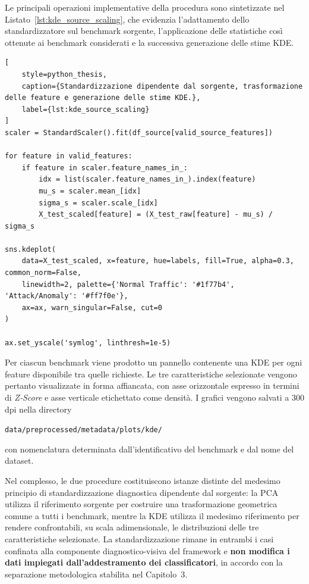 Le principali operazioni implementative della procedura sono sintetizzate
nel Listato~\ref{lst:kde_source_scaling}, che evidenzia l'adattamento dello
standardizzatore sul benchmark sorgente, l'applicazione delle statistiche
così ottenute ai benchmark considerati e la successiva generazione delle
stime KDE.

\begin{lstlisting}[
    style=python_thesis,
    caption={Standardizzazione dipendente dal sorgente, trasformazione delle feature e generazione delle stime KDE.},
    label={lst:kde_source_scaling}
]
scaler = StandardScaler().fit(df_source[valid_source_features])

for feature in valid_features:
    if feature in scaler.feature_names_in_:
        idx = list(scaler.feature_names_in_).index(feature)
        mu_s = scaler.mean_[idx]
        sigma_s = scaler.scale_[idx]
        X_test_scaled[feature] = (X_test_raw[feature] - mu_s) / sigma_s

sns.kdeplot(
    data=X_test_scaled, x=feature, hue=labels, fill=True, alpha=0.3, common_norm=False,
    linewidth=2, palette={'Normal Traffic': '#1f77b4', 'Attack/Anomaly': '#ff7f0e'},
    ax=ax, warn_singular=False, cut=0
)

ax.set_yscale('symlog', linthresh=1e-5)
\end{lstlisting}

Per ciascun benchmark viene prodotto un pannello contenente una KDE per ogni feature disponibile tra quelle richieste. 
Le tre caratteristiche selezionate vengono pertanto visualizzate in forma affiancata, con asse orizzontale espresso in termini di \textit{Z-Score} e asse verticale etichettato come densità. 
I grafici vengono salvati a $300$ dpi nella directory 
\begin{center}
    \texttt{data/preprocessed/metadata/plots/kde/}
\end{center}
con nomenclatura determinata dall'identificativo del benchmark e dal nome del dataset.

Nel complesso, le due procedure costituiscono istanze distinte del medesimo principio di standardizzazione diagnostica dipendente dal sorgente: la PCA utilizza il riferimento sorgente per costruire una trasformazione geometrica comune a tutti i benchmark, mentre la KDE utilizza il medesimo riferimento per rendere confrontabili, su scala adimensionale, le distribuzioni delle tre caratteristiche selezionate. 
La standardizzazione rimane in entrambi i casi confinata alla componente diagnostico-visiva del framework e \textbf{non modifica i dati impiegati dall'addestramento dei classificatori}, in accordo con la separazione metodologica stabilita nel Capitolo~3.

